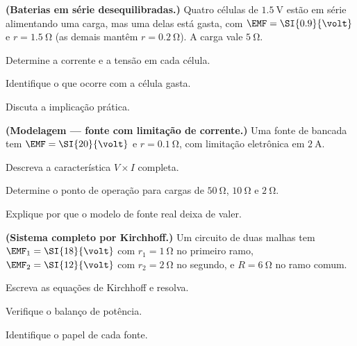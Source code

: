 \begin{questao}[4]{}

\textbf{(Baterias em série desequilibradas.)} Quatro células de
$\SI{1.5}{\volt}$ estão em série alimentando uma carga, mas uma delas está
gasta, com $\EMF=\SI{0.9}{\volt}$ e $r=\SI{1.5}{\ohm}$ (as demais mantêm
$r=\SI{0.2}{\ohm}$). A carga vale $\SI{5}{\ohm}$.
\begin{itensq}
\item Determine a corrente e a tensão em cada célula.
\item Identifique o que ocorre com a célula gasta.
\item Discuta a implicação prática.
\end{itensq}


\end{questao}
\begin{questao}[4]{}

\textbf{(Modelagem --- fonte com limitação de corrente.)} Uma fonte de bancada
tem $\EMF=\SI{20}{\volt}$ e $r=\SI{0.1}{\ohm}$, com limitação eletrônica em
$\SI{2}{\ampere}$.
\begin{itensq}
\item Descreva a característica $V\times I$ completa.
\item Determine o ponto de operação para cargas de $\SI{50}{\ohm}$,
      $\SI{10}{\ohm}$ e $\SI{2}{\ohm}$.
\item Explique por que o modelo de fonte real deixa de valer.
\end{itensq}


\end{questao}
\begin{questao}[4]{}

\textbf{(Sistema completo por Kirchhoff.)} Um circuito de duas malhas tem
$\EMF_1=\SI{18}{\volt}$ com $r_1=\SI{1}{\ohm}$ no primeiro ramo,
$\EMF_2=\SI{12}{\volt}$ com $r_2=\SI{2}{\ohm}$ no segundo, e
$R=\SI{6}{\ohm}$ no ramo comum.
\begin{itensq}
\item Escreva as equações de Kirchhoff e resolva.
\item Verifique o balanço de potência.
\item Identifique o papel de cada fonte.
\end{itensq}


\end{questao}

